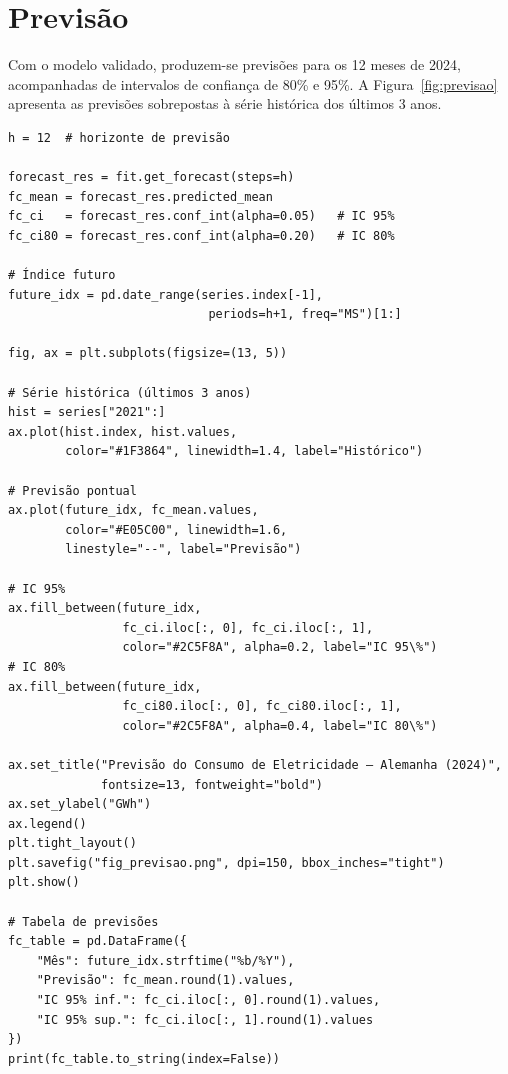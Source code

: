 \documentclass[12pt, a4paper]{article}
\begin{document}
\section{Previsão}
\label{sec:previsao}

Com o modelo validado, produzem-se previsões para os 12 meses de 2024, acompanhadas
de intervalos de confiança de 80\% e 95\%. A Figura~\ref{fig:previsao} apresenta as
previsões sobrepostas à série histórica dos últimos 3 anos.

\begin{lstlisting}[caption={Geração e visualização das previsões.},
                   label={lst:previsao}]
h = 12  # horizonte de previsão

forecast_res = fit.get_forecast(steps=h)
fc_mean = forecast_res.predicted_mean
fc_ci   = forecast_res.conf_int(alpha=0.05)   # IC 95%
fc_ci80 = forecast_res.conf_int(alpha=0.20)   # IC 80%

# Índice futuro
future_idx = pd.date_range(series.index[-1],
                            periods=h+1, freq="MS")[1:]

fig, ax = plt.subplots(figsize=(13, 5))

# Série histórica (últimos 3 anos)
hist = series["2021":]
ax.plot(hist.index, hist.values,
        color="#1F3864", linewidth=1.4, label="Histórico")

# Previsão pontual
ax.plot(future_idx, fc_mean.values,
        color="#E05C00", linewidth=1.6,
        linestyle="--", label="Previsão")

# IC 95%
ax.fill_between(future_idx,
                fc_ci.iloc[:, 0], fc_ci.iloc[:, 1],
                color="#2C5F8A", alpha=0.2, label="IC 95\%")
# IC 80%
ax.fill_between(future_idx,
                fc_ci80.iloc[:, 0], fc_ci80.iloc[:, 1],
                color="#2C5F8A", alpha=0.4, label="IC 80\%")

ax.set_title("Previsão do Consumo de Eletricidade — Alemanha (2024)",
             fontsize=13, fontweight="bold")
ax.set_ylabel("GWh")
ax.legend()
plt.tight_layout()
plt.savefig("fig_previsao.png", dpi=150, bbox_inches="tight")
plt.show()

# Tabela de previsões
fc_table = pd.DataFrame({
    "Mês": future_idx.strftime("%b/%Y"),
    "Previsão": fc_mean.round(1).values,
    "IC 95% inf.": fc_ci.iloc[:, 0].round(1).values,
    "IC 95% sup.": fc_ci.iloc[:, 1].round(1).values
})
print(fc_table.to_string(index=False))
\end{lstlisting}
\end{document}
